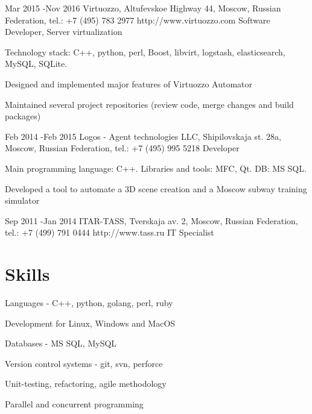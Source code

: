 \documentclass[9pt]{article} %
\begin{document}

\job
{Mar 2015 -}{Nov 2016}
{Virtuozzo, Altufevskoe Highway 44, Moscow, Russian Federation, tel.: +7 (495) 783 2977}
{http://www.virtuozzo.com}
{Software Developer, Server virtualization}
{
Technology stack: C++, python, perl, Boost, libvirt, logstash, elasticsearch, MySQL, SQLite.
\begin{itemize-noindent}
\setlength\itemsep{0em}
\item{Designed and implemented major features of Virtuozzo Automator}
\item{Maintained several project repositories (review code, merge changes and build packages)}
\end{itemize-noindent}
}


\job
{Feb 2014 -}{Feb 2015}
{Logos - Agent technologies LLC, Shipilovskaja st. 28a, Moscow, Russian Federation, tel.: +7 (495) 995 5218}
{}
{Developer}
{
Main programming language: C++. Libraries and tools: MFC, Qt. DB: MS SQL.
\begin{itemize-noindent}
\setlength\itemsep{0em}
\item{Developed a tool to automate a 3D scene creation and a Moscow subway training simulator}
\end{itemize-noindent}
}


\job
{Sep 2011 -}{Jan 2014}
{ITAR-TASS, Tverskaja av. 2, Moscow, Russian Federation, tel.: +7 (499) 791 0444}
{http://www.tass.ru}
{IT Specialist}


\section{Skills}

\begin{multicols}{2}
\begin{itemize-noindent}
\setlength\itemsep{0em}
\item Languages - C++, python, golang, perl, ruby
\item Development for Linux, Windows and MacOS
\item Databases - MS SQL, MySQL
\item Version control systems - git, svn, perforce
\item Unit-testing, refactoring, agile methodology
\item Parallel and concurrent programming
\end{itemize-noindent}
\end{multicols}
\end{document}
